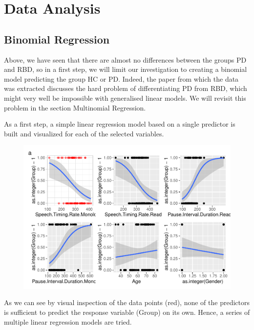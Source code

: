 \documentclass[
  english,
  doc,floatsintext]{apa6}
\begin{document}
\newpage

\hypertarget{data-analysis}{%
\section{Data Analysis}\label{data-analysis}}

\hypertarget{binomial-regression}{%
\subsection{Binomial Regression}\label{binomial-regression}}

Above, we have seen that there are almost no differences between the groups PD and RBD, so in a first step, we will limit our investigation to creating a binomial model predicting the group HC or PD. Indeed, the paper from which the data was extracted discusses the hard problem of differentiating PD from RBD, which might very well be impossible with generalised linear models. We will revisit this problem in the section Multinomial Regression.

As a first step, a simple linear regression model based on a single predictor is built and visualized for each of the selected variables.

\begin{figure}

{\centering \includegraphics{dap_report_anja_probst_files/figure-latex/simple-linear-regression-1} 

}

\caption{ }\label{fig:simple-linear-regression}
\end{figure}

As we can see by visual inspection of the data points (red), none of the predictors is sufficient to predict the response variable (Group) on its own. Hence, a series of multiple
linear regression models are tried.
\end{document}
